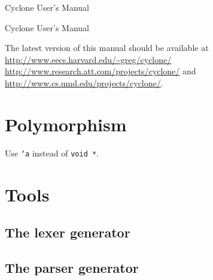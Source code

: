 \ifscreen
\thispagestyle{empty}
\textcolor{bluegray}{
\vspace{.5in}
\begin{center}
  {\fontsize{.9in}{.8in}\selectfont Cyclone User's Manual}\\[.5in]
\end{center}
}
\else
\vspace{1in}
\begin{center}
  \Huge Cyclone User's Manual
\end{center}
\fi
\begin{center}

The latest version of this manual should be available at\\
\href{http://www.eecs.harvard.edu/~greg/cyclone/}{\url{http://www.eecs.harvard.edu/~greg/cyclone/}}\\
\href{http://www.research.att.com/projects/cyclone/}{\url{http://www.research.att.com/projects/cyclone/}} and
\href{http://www.cs.umd.edu/projects/cyclone/}{\url{http://www.cs.umd.edu/projects/cyclone/}}.
\end{center}


\newpage

\tableofcontents
\newpage

\section{Polymorphism}
\hypertarget{polymorphism}{}

Use \texttt{`a} instead of \texttt{void *}.


\appendix





\section{Tools}

\subsection{The lexer generator}
\subsection{The parser generator}



\printindex



